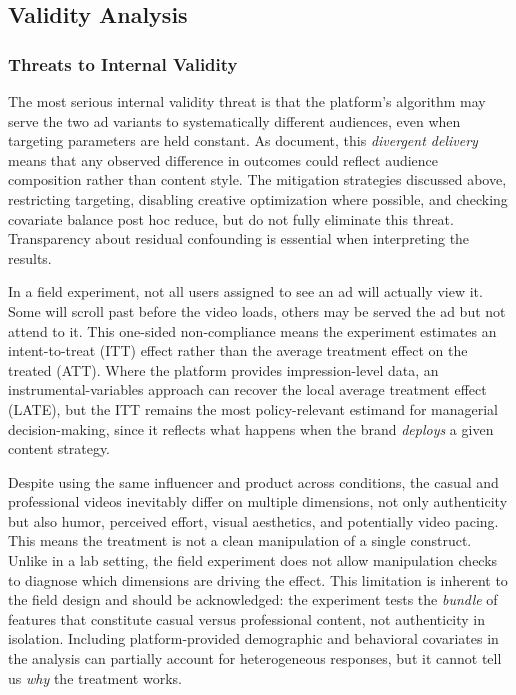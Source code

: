 \documentclass[10pt]{article}
\begin{document}
\subsection{Validity Analysis}

\subsubsection{Threats to Internal Validity}

The most serious internal validity threat is that the platform's algorithm may serve the two ad variants to systematically different audiences, even when targeting parameters are held constant. As \textcite{braun2025abtesting} document, this \textit{divergent delivery} means that any observed difference in outcomes could reflect audience composition rather than content style. The mitigation strategies discussed above, restricting targeting, disabling creative optimization where possible, and checking covariate balance post hoc reduce, but do not fully eliminate this threat. Transparency about residual confounding is essential when interpreting the results.

In a field experiment, not all users assigned to see an ad will actually view it. Some will scroll past before the video loads, others may be served the ad but not attend to it. This one-sided non-compliance means the experiment estimates an intent-to-treat (ITT) effect rather than the average treatment effect on the treated (ATT). Where the platform provides impression-level data, an instrumental-variables approach can recover the local average treatment effect (LATE), but the ITT remains the most policy-relevant estimand for managerial decision-making, since it reflects what happens when the brand \textit{deploys} a given content strategy.

Despite using the same influencer and product across conditions, the casual and professional videos inevitably differ on multiple dimensions, not only authenticity but also humor, perceived effort, visual aesthetics, and potentially video pacing. This means the treatment is not a clean manipulation of a single construct. Unlike in a lab setting, the field experiment does not allow manipulation checks to diagnose which dimensions are driving the effect. This limitation is inherent to the field design and should be acknowledged: the experiment tests the \textit{bundle} of features that constitute casual versus professional content, not authenticity in isolation. Including platform-provided demographic and behavioral covariates in the analysis can partially account for heterogeneous responses, but it cannot tell us \textit{why} the treatment works.
\end{document}
